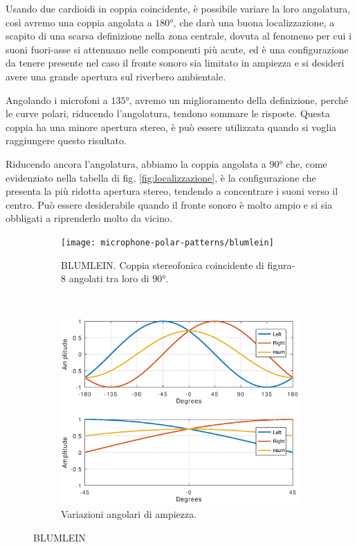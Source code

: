 Usando due cardioidi in coppia coincidente, è possibile variare la loro
angolatura, così avremo una coppia angolata a $180°$, che darà una buona
localizzazione, a scapito di una scarsa definizione nella zona centrale,
dovuta al fenomeno per cui i suoni fuori-asse si attenuano nelle componenti più
acute, ed è una configurazione da tenere presente nel caso il fronte sonoro
sia limitato in ampiezza e si desideri avere una grande apertura sul
riverbero ambientale.

Angolando i microfoni a $135°$, avremo un miglioramento
della definizione, perché le curve polari, riducendo l’angolatura, tendono
sommare le risposte. Questa coppia ha una minore apertura stereo, è può essere
utilizzata quando si voglia raggiungere questo risultato.

Riducendo ancora l’angolatura, abbiamo la coppia angolata a $90°$ che, come
evidenziato nella tabella di fig. \ref{fig:localizzazione}, è la configurazione
che presenta la più ridotta apertura stereo, tendendo a concentrare i suoni
verso il centro. Può essere desiderabile quando il fronte sonoro è molto ampio
e si sia obbligati a riprenderlo molto da vicino.

\clearpage

\begin{figure}[t]
    \centering
    \begin{subfigure}[t]{0.99\textwidth}
        \centering
        \texttt{[image: microphone-polar-patterns/blumlein]}
        \caption[]{BLUMLEIN. Coppia stereofonica coincidente di figura-8 angolati tra loro di $90°$.}%
        \label{pol:blumleinsp}
    \end{subfigure}%
    \\
    \begin{subfigure}[t]{0.99\textwidth}
        \centering
        \includegraphics[width=12.5cm]{CAPITOLI/0300/IMG/blumleinsub}
        \caption[]{Variazioni angolari di ampiezza.}%
        \label{plot:blumlein}
    \end{subfigure}
    \caption[]{BLUMLEIN}
    \label{sp:blumlein}
\end{figure}

